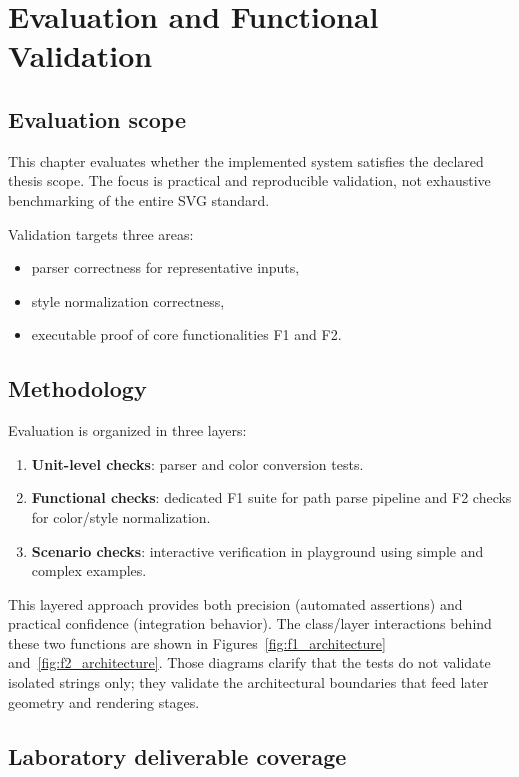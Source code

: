 \chapter{Evaluation and Functional Validation}
\label{chap:validation}

\section{Evaluation scope}

This chapter evaluates whether the implemented system satisfies the declared thesis scope.
The focus is practical and reproducible validation, not exhaustive benchmarking of the entire SVG standard.

Validation targets three areas:

\begin{itemize}
\item parser correctness for representative inputs,
\item style normalization correctness,
\item executable proof of core functionalities F1 and F2.
\end{itemize}

\section{Methodology}

Evaluation is organized in three layers:

\begin{enumerate}
\item \textbf{Unit-level checks}: parser and color conversion tests.
\item \textbf{Functional checks}: dedicated F1 suite for path parse pipeline and F2 checks for color/style normalization.
\item \textbf{Scenario checks}: interactive verification in playground using simple and complex examples.
\end{enumerate}

This layered approach provides both precision (automated assertions) and practical confidence (integration behavior).
The class/layer interactions behind these two functions are shown in Figures~\ref{fig:f1_architecture} and~\ref{fig:f2_architecture}.
Those diagrams clarify that the tests do not validate isolated strings only; they validate the architectural boundaries that feed later geometry and rendering stages.

\section{Laboratory deliverable coverage}

